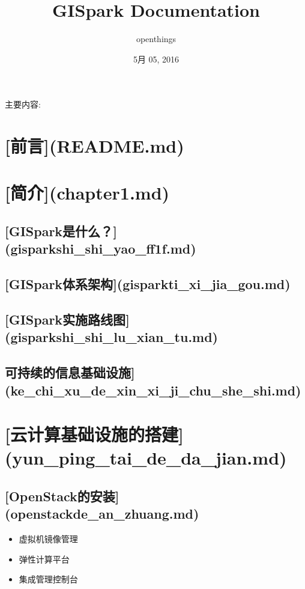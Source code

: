 \documentclass[letterpaper,10pt,english]{sphinxmanual}
\title{GISpark Documentation}
\date{5月 05, 2016}
\author{openthings}
\begin{document}
\maketitle
\tableofcontents
{}\label{index::doc}


主要内容:


\chapter{{[}前言{]}(README.md)}
\label{index:readme-md}\label{index:gispark}

\chapter{{[}简介{]}(chapter1.md)}
\label{index:chapter1-md}

\section{{[}GISpark是什么？{]}(gisparkshi\_shi\_yao\_ff1f.md)}
\label{index:gispark-gisparkshi-shi-yao-ff1f-md}

\section{{[}GISpark体系架构{]}(gisparkti\_xi\_jia\_gou.md)}
\label{index:gispark-gisparkti-xi-jia-gou-md}

\section{{[}GISpark实施路线图{]}(gisparkshi\_shi\_lu\_xian\_tu.md)}
\label{index:gispark-gisparkshi-shi-lu-xian-tu-md}

\section{可持续的信息基础设施{]}(ke\_chi\_xu\_de\_xin\_xi\_ji\_chu\_she\_shi.md)}
\label{index:ke-chi-xu-de-xin-xi-ji-chu-she-shi-md}

\chapter{{[}云计算基础设施的搭建{]}(yun\_ping\_tai\_de\_da\_jian.md)}
\label{index:yun-ping-tai-de-da-jian-md}

\section{{[}OpenStack的安装{]}(openstackde\_an\_zhuang.md)}
\label{index:openstack-openstackde-an-zhuang-md}\begin{itemize}
\item {} 
虚拟机镜像管理

\item {} 
弹性计算平台

\item {} 
集成管理控制台

\end{itemize}
\end{document}
